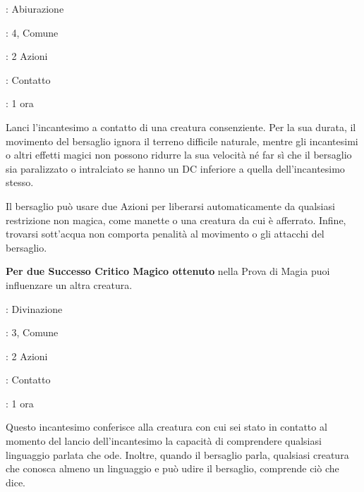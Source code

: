 \begin{multicols}{2}
\noindent\colorbox{OBSSgold!10}{
\begin{minipage}{0.95\linewidth}
\begin{description}[noitemsep, topsep=0pt, parsep=0pt, partopsep=0pt, leftmargin=0cm, labelwidth=1.3cm]
	\item[\textbf{Lista}]: Abiurazione
	\item[\textbf{Livello}]: 4, Comune
	\item[\textbf{Lancio}]: 2 Azioni
	\item[\textbf{Gittata}]: Contatto
	\item[\textbf{Durata}]: 1 ora
\end{description}
\end{minipage}}\smallskip

Lanci l'incantesimo a contatto di una creatura consenziente. Per la sua durata, il movimento del bersaglio ignora il terreno difficile naturale, mentre gli incantesimi o altri effetti magici non possono ridurre la sua velocità né far sì che il bersaglio sia paralizzato o intralciato se hanno un DC inferiore a quella dell'incantesimo stesso.

Il bersaglio può usare due Azioni per liberarsi automaticamente da qualsiasi restrizione non magica, come manette o una creatura da cui è afferrato. Infine, trovarsi sott'acqua non comporta penalità al movimento o gli attacchi del bersaglio.

\textbf{Per due Successo Critico Magico ottenuto} nella Prova di Magia puoi influenzare un altra creatura.

\noindent\colorbox{OBSSgold!10}{
\begin{minipage}{0.95\linewidth}
\begin{description}[noitemsep, topsep=0pt, parsep=0pt, partopsep=0pt, leftmargin=0cm, labelwidth=1.3cm]
	\item[\textbf{Lista}]: Divinazione
	\item[\textbf{Livello}]: 3, Comune
	\item[\textbf{Lancio}]: 2 Azioni
	\item[\textbf{Gittata}]: Contatto
	\item[\textbf{Durata}]: 1 ora
\end{description}
\end{minipage}}\smallskip

Questo incantesimo conferisce alla creatura con cui sei stato in contatto al momento del lancio dell'incantesimo la capacità di comprendere qualsiasi linguaggio parlata che ode. Inoltre, quando il bersaglio parla, qualsiasi creatura che conosca almeno un linguaggio e può udire il bersaglio, comprende ciò che dice.


\end{multicols}

